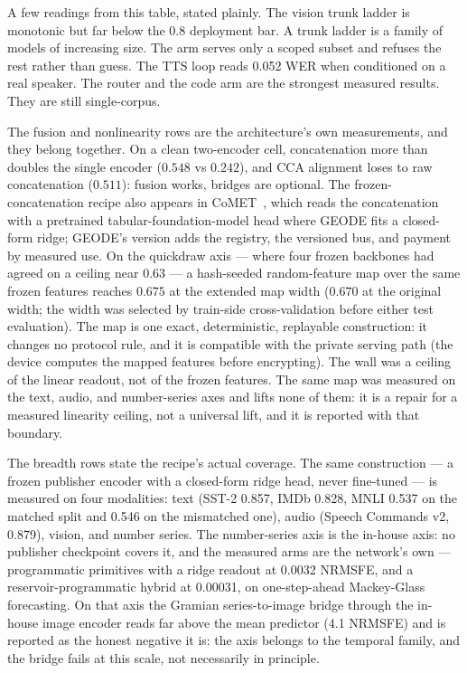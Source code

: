 \documentclass[11pt]{article}
\begin{document}
A few readings from this table, stated plainly. The vision trunk
ladder is monotonic but far below the 0.8 deployment bar. A trunk
ladder is a family of models of increasing size. The arm serves
only a scoped subset and refuses the rest rather than guess. The
TTS loop reads 0.052 WER when conditioned on a
real speaker. The router and the code arm are the strongest
measured results. They are still single-corpus.

The fusion and nonlinearity rows are the architecture's own
measurements, and they belong together. On a clean two-encoder cell, concatenation
more than doubles the single encoder ($0.548$ vs $0.242$), and
CCA alignment loses to raw concatenation ($0.511$): fusion works,
bridges are optional. The frozen-concatenation recipe also
appears in CoMET~\cite{comet2026}, which reads the
concatenation with a pretrained tabular-foundation-model head
where GEODE fits a closed-form ridge; GEODE's version adds the
registry, the versioned bus, and payment by measured use. On the quickdraw axis --- where four frozen
backbones had agreed on a ceiling near $0.63$ --- a hash-seeded
random-feature map over the same frozen features reaches $0.675$
at the extended map width ($0.670$ at the original width; the
width was selected by train-side cross-validation before either
test evaluation). The map is one exact, deterministic, replayable
construction: it changes no protocol rule, and it is compatible
with the private serving path (the device computes the mapped
features before encrypting). The wall was a ceiling of the linear
readout, not of the frozen features. The same map was measured on
the text, audio, and number-series axes and lifts none of them:
it is a repair for a measured linearity ceiling, not a universal
lift, and it is reported with that boundary.

The breadth rows state the recipe's actual coverage. The same
construction --- a frozen publisher encoder with a closed-form
ridge head, never fine-tuned --- is measured on four modalities:
text (SST-2 0.857, IMDb 0.828, MNLI 0.537 on the matched split
and 0.546 on the mismatched one), audio (Speech Commands v2,
0.879), vision, and number series. The number-series axis is the
in-house axis: no publisher checkpoint covers it, and the
measured arms are the network's own --- programmatic primitives
with a ridge readout at 0.0032 NRMSFE, and a
reservoir-programmatic hybrid at 0.00031, on one-step-ahead
Mackey-Glass forecasting. On that axis the Gramian
series-to-image bridge through the in-house image encoder reads
far above the mean predictor (4.1 NRMSFE) and is reported as the
honest negative it is: the axis belongs to the temporal family,
and the bridge fails at this scale, not necessarily in
principle.
\end{document}

